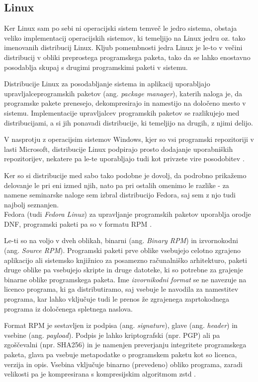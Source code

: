 \subsection{Linux}

Ker Linux sam po sebi ni operacijski sistem temveč le jedro sistema, obstaja veliko implementacij operacijskih sistemov,
ki temeljijo na Linux jedru oz. tako imenovanih distribucij Linux.
Kljub pomembnosti jedra Linux je le-to v večini distribucij v obliki preprostega programskega paketa,
tako da se lahko enostavno posodablja skupaj s drugimi programskimi paketi v sistemu.

Distribucije Linux za posodabljanje sistema in aplikacij uporabljajo upravljalce\linebreak programskih paketov
(ang. \emph{package manager}), katerih naloga je, da programske pakete prenesejo,
dekompresirajo in namestijo na določeno mesto v sistemu.
Implementacije upravljalcev programskih paketov se razlikujejo med distribucijami,
a si jih ponavadi distribucije, ki temeljijo na drugih, z njimi delijo.

V nasprotju z operacijsim sistemov Windows, kjer so vsi programski repozitoriji v lasti Microsoft,
distribucije Linux podpirajo prosto dodajanje uporabniških repozitorijev, nekatere pa le-te uporabljajo tudi
kot privzete vire posodobitev \cite{arch-mirrors}.

Ker so si distribucije med sabo tako podobne je dovolj, da podrobno prikažemo delovanje le pri eni izmed njih, nato
pa pri ostalih omenimo le razlike - za namene seminarske naloge sem izbral distribucijo Fedora, saj sem z njo tudi
najbolj seznanjen.\\

Fedora (tudi \emph{Fedora Linux}) za upravljanje programskih paketov uporablja orodje DNF,
programski paketi pa so v formatu RPM \cite{rpm}.

Le-ti so na voljo v dveh oblikah, binarni (ang. \emph{Binary RPM}) in izvornokodni (ang. \emph{Source RPM}).
Programski paketi prve oblike vsebujejo celotno zgrajeno aplikacijo ali sistemsko knjižnico za posamezno
računalniško arhitekturo, paketi druge oblike pa vsebujejo skripte in druge datoteke, ki so potrebne za grajenje
binarne oblike programskega paketa.
Ime \emph{izvornikodni format} se ne navezuje na licenco programa, ki ga distributiramo, saj vsebuje le navodila
za namestitev programa, kar lahko vključuje tudi le prenos že zgrajenega zaprtokodnega programa
iz določenega spletnega naslova.

Format RPM je sestavljen iz podpisa (ang. \emph{signature}), glave (ang. \emph{header}) in vsebine
(ang. \emph{payload}).
Podpis je lahko kriptografski (npr. PGP) ali pa zgoščevalni (npr. SHA256) in je namenjen preverjanju integritete
programskega paketa, glava pa vsebuje metapodatke o programskem paketu kot so licenca, verzija in opis.
Vsebina vključuje binarno (prevedeno) obliko programa, zaradi velikosti pa je kompresirana
s kompresijskim algoritmom zstd \cite{fedora-zstd}.

